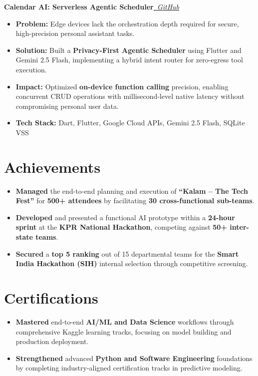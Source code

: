\documentclass[a4paper,10pt]{article}
\newcommand{\entry}[2]{\textbf{#1}\hfill\textit{#2}\\[-1pt]}
\begin{document}
\entry{Calendar AI: Serverless Agentic Scheduler}{\href{https://github.com/Yashwant00CR7/Calendar-Agent}{\faGithub\ GitHub}} \vspace{-10pt}
\begin{itemize}[topsep=-5pt, itemsep=0pt, parsep=0pt]
    \item \textbf{Problem:} Edge devices lack the orchestration depth required for secure, high-precision personal assistant tasks.
    \item \textbf{Solution:} Built a \textbf{Privacy-First Agentic Scheduler} using Flutter and Gemini 2.5 Flash, implementing a hybrid intent router for zero-egress tool execution.
    \item \textbf{Impact:} Optimized \textbf{on-device function calling} precision, enabling concurrent CRUD operations with millisecond-level native latency without compromising personal user data.
    \item \textbf{Tech Stack:} Dart, Flutter, Google Cloud APIs, Gemini 2.5 Flash, SQLite VSS
\end{itemize}

\section*{Achievements}
\begin{itemize}[leftmargin=*, noitemsep, topsep=2pt]
    \item \textbf{Managed} the end-to-end planning and execution of \textbf{``Kalam -- The Tech Fest''} for \textbf{500+ attendees} by facilitating \textbf{30 cross-functional sub-teams}.
    \item \textbf{Developed} and presented a functional AI prototype within a \textbf{24-hour sprint} at the \textbf{KPR National Hackathon}, competing against \textbf{50+ inter-state teams}.
    \item \textbf{Secured} a \textbf{top 5 ranking} out of 15 departmental teams for the \textbf{Smart India Hackathon (SIH)} internal selection through competitive screening.
\end{itemize}

\section*{Certifications}
\begin{itemize}[leftmargin=*, noitemsep, topsep=2pt]
    \item \textbf{Mastered} end-to-end \textbf{AI/ML and Data Science} workflows through comprehensive Kaggle learning tracks, focusing on model building and production deployment.
    \item \textbf{Strengthened} advanced \textbf{Python and Software Engineering} foundations by completing industry-aligned certification tracks in predictive modeling.
\end{itemize}
\end{document}
